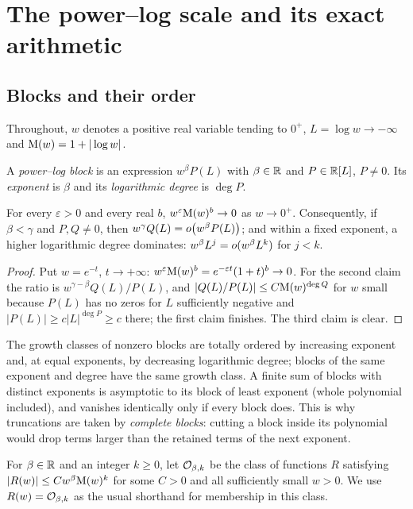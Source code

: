 \section{The power--log scale and its exact arithmetic}
\label{sec:scale}

\subsection{Blocks and their order}

Throughout, $w$ denotes a positive real variable tending to $0^+$, $L=\log w\to-\infty$ and $\mathrm M(w)=1+|\log w|$.

\begin{definition}[Blocks]
A \emph{power--log block} is an expression $w^\beta P(L)$ with $\beta\in\mathbb R$ and $P\in\mathbb R[L]$, $P\ne0$. Its \emph{exponent} is $\beta$ and its \emph{logarithmic degree} is $\deg P$.
\end{definition}

\begin{lemma}
\label{lem:dominance}
For every $\varepsilon>0$ and every real $b$, $w^\varepsilon\mathrm M(w)^b\to0$ as $w\to0^+$. Consequently, if $\beta<\gamma$ and $P,Q\ne0$, then $w^\gamma Q(L)=o\bigl(w^\beta P(L)\bigr)$; and within a fixed exponent, a higher logarithmic degree dominates: $w^\beta L^j=o(w^\beta L^k)$ for $j<k$.
\end{lemma}
\begin{proof}
Put $w=e^{-t}$, $t\to+\infty$: $w^\varepsilon\mathrm M(w)^b=e^{-\varepsilon t}(1+t)^b\to0$. For the second claim the ratio is $w^{\gamma-\beta}Q(L)/P(L)$, and $|Q(L)/P(L)|\le C\mathrm M(w)^{\deg Q}$ for $w$ small because $P(L)$ has no zeros for $L$ sufficiently negative and $|P(L)|\ge c|L|^{\deg P}\ge c$ there; the first claim finishes. The third claim is clear.
\end{proof}

The growth classes of nonzero blocks are totally ordered by increasing exponent and, at equal exponents, by decreasing logarithmic degree; blocks of the same exponent and degree have the same growth class. A finite sum of blocks with distinct exponents is asymptotic to its block of least exponent (whole polynomial included), and vanishes identically only if every block does. This is why truncations are taken by \emph{complete blocks}: cutting a block inside its polynomial would drop terms larger than the retained terms of the next exponent.

\begin{definition}
For $\beta\in\mathbb R$ and an integer $k\ge0$, let $\mathcal O_{\beta,k}$ be the
class of functions $R$ satisfying
$|R(w)|\le Cw^\beta\mathrm M(w)^k$ for some $C>0$ and all sufficiently
small $w>0$. We use $R(w)=\mathcal O_{\beta,k}$ as the usual shorthand for
membership in this class.
\end{definition}

